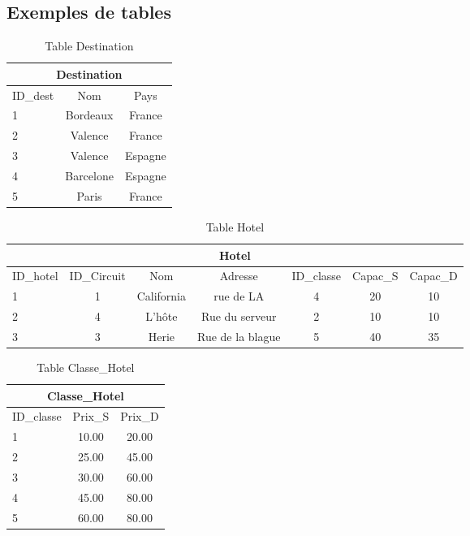 \subsection{Exemples de tables}


\begin{table}[h]
\begin{center}
\begin{tabular}{|l|c|c|}
\hline
\multicolumn{3}{|c|}{Destination}\\
\hline
ID\_dest& Nom & Pays \\
\hline
1 & Bordeaux& France\\
\hline
2 & Valence& France\\
\hline
3 & Valence& Espagne\\
\hline
4 & Barcelone& Espagne\\
\hline
5 & Paris& France\\
\hline
\end{tabular}
\end{center}
\caption{Table Destination}
\end{table}


\begin{table}[h]
\begin{center}
\begin{tabular}{|l|c|c|c|c|c|c|}
\hline
\multicolumn{7}{|c|}{Hotel}\\
\hline
ID\_hotel& ID\_Circuit& Nom & Adresse &ID\_classe & Capac\_S & Capac\_D  \\
\hline
1 & 1& California&rue de LA& 4 & 20 & 10\\
\hline
2 & 4& L'h\^ote&Rue du serveur& 2 & 10 & 10\\
\hline
3 & 3& Herie&Rue de la blague& 5 & 40 & 35\\
\hline
\end{tabular}
\end{center}
\caption{Table Hotel}
\end{table}


\begin{table}[h]
\begin{center}
\begin{tabular}{|l|c|c|}
\hline
\multicolumn{3}{|c|}{Classe\_Hotel}\\
\hline
ID\_classe& Prix\_S & Prix\_D \\
\hline
1 & 10.00& 20.00\\
\hline
2 & 25.00& 45.00\\
\hline
3 & 30.00& 60.00\\
\hline
4 &  45.00& 80.00\\
\hline
5 & 60.00& 80.00\\
\hline
\end{tabular}
\end{center}
\caption{Table Classe\_Hotel}
\end{table}

